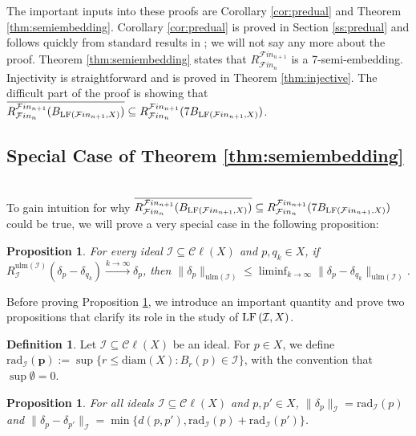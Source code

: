 \documentclass[12pt]{amsart}
\newtheorem{prop}[theorem]{Proposition}
\theoremstyle{definition}
\newtheorem{definition}[theorem]{Definition}
\numberwithin{equation}{section}
\def \F {\mathcal{F}in}
\def \I {\mathcal{I}}
\def \sbs {\subseteq}
\def \closure {\overline}
\newcommand{\Cl}[1]{\mathcal{C}\ell\left(#1\right)}
\newcommand{\rad}[2]{\mathrm{rad}_{#1}\left(#2\right)}
\newcommand{\diam}[1]{\mathrm{diam}\left( #1 \right)}
\newcommand{\ulm}[1]{\mathrm{ulm}\left(#1\right)}
\begin{document}
The important inputs into these proofs are Corollary \ref{cor:predual} and Theorem \ref{thm:semiembedding}. Corollary \ref{cor:predual} is proved in Section \ref{ss:predual} and follows quickly from standard results in \cite{W}; we will not say any more about the proof. Theorem \ref{thm:semiembedding} states that $R^{\F_{n+1}}_{\F_n}$ is a 7-semi-embedding. Injectivity is straightforward and is proved in Theorem \ref{thm:injective}. The difficult part of the proof is showing that $\closure{R^{\F_{n+1}}_{\F_n}(B_{\LF{\F_{n+1}}{X}})} \sbs R^{\F_{n+1}}_{\F_n}(7B_{\LF{\F_{n+1},X}})$. \\

\subsection{Special Case of Theorem \ref{thm:semiembedding}} ~\\
\indent To gain intuition for why $\closure{R^{\F_{n+1}}_{\F_n}(B_{\LF{\F_{n+1}}{X}})} \sbs R^{\F_{n+1}}_{\F_n}(7B_{\LF{\F_{n+1},X}})$ could be true, we will prove a very special case in the following proposition:

\begin{prop} \label{prop:semiembeddingspecial}
For every ideal $\I \sbs \Cl{X}$ and $p,q_k \in X$, if \\ $R^{\ulm{\I}}_{\I}(\delta_p-\delta_{q_k}) \overset{k \to \infty}{\to} \delta_p$, then $\|\delta_p\|_{\ulm{\I}} \leq \liminf_{k \to \infty} \|\delta_p-\delta_{q_k}\|_{\ulm{\I}}$.
\end{prop}

Before proving Proposition \ref{prop:semiembeddingspecial}, we introduce an important quantity and prove two propositions that clarify its role in the study of $\LF{\I}{X}$.

\begin{definition}
Let $\I \sbs \Cl{X}$ be an ideal. For $p \in X$, we define $\boldsymbol{\rad{\I}{p}} := \sup \{r \leq \diam{X}: B_r(p) \in \I\}$, with the convention that $\sup \emptyset = 0$.
\end{definition}

\begin{prop} \label{prop:radInorm}
For all ideals $\I \sbs \Cl{X}$ and $p,p' \in X$, $\|\delta_p\|_\I = \rad{\I}{p}$ and $\|\delta_p-\delta_{p'}\|_\I = \min\{d(p,p'),\rad{\I}{p}+\rad{\I}{p'}\}$.
\end{prop}
\end{document}
